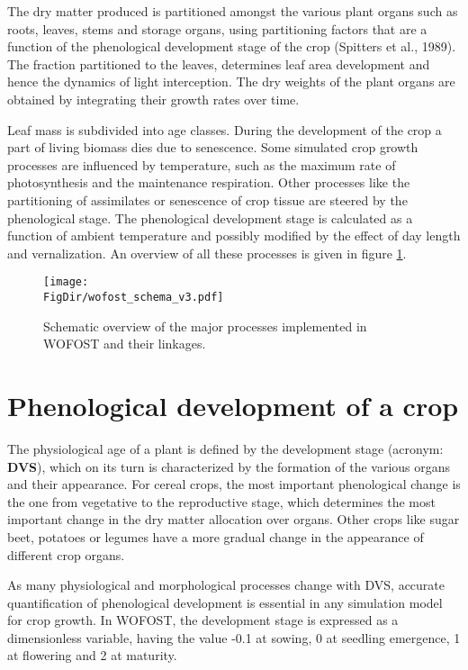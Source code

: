 The dry matter produced is partitioned amongst the various plant organs such as roots,
leaves, stems and storage organs, using partitioning factors that are a function of the
phenological development stage of the crop (Spitters et al., 1989). The fraction partitioned
to the leaves, determines leaf area development and hence the dynamics of light interception. 
The dry weights of the plant organs are obtained by integrating their growth rates over time.

Leaf mass is subdivided into age classes. During the development of the crop a part of
living biomass dies due to senescence. Some simulated crop growth processes are
influenced by temperature, such as the maximum rate of photosynthesis and the
maintenance respiration. Other processes like the partitioning of assimilates or senescence of
crop tissue are steered by the phenological stage. The phenological development stage is
calculated as a function of ambient temperature and possibly modified by the effect of day
length and vernalization. An overview of all these processes is given in figure 
\ref{fig:CropGrowthProc2}.

\begin{figure}[p]
	\centering
	\texttt{[image: \\FigDir/wofost\_schema\_v3.pdf]}
	\caption{Schematic overview of the major processes implemented in WOFOST and their linkages.}
	\label{fig:CropGrowthProc2}
\end{figure}

\section{Phenological development of a crop}

The physiological age of a plant is defined by the development stage (acronym: {\bf DVS}), which on its turn is
characterized by the formation of the various organs and their appearance. For cereal crops, the most
important phenological change is the one from vegetative to the reproductive stage, which
determines the most important change in the dry matter allocation over organs. Other crops like
sugar beet, potatoes or legumes have a more gradual change in the appearance of different crop organs.

As many physiological and morphological processes change with DVS, accurate quantification 
of phenological development is essential in any simulation
model for crop growth. In WOFOST, the development stage is expressed as a dimensionless variable, 
having the value -0.1 at sowing, 0 at seedling emergence, 1 at flowering and 2 at maturity. 

